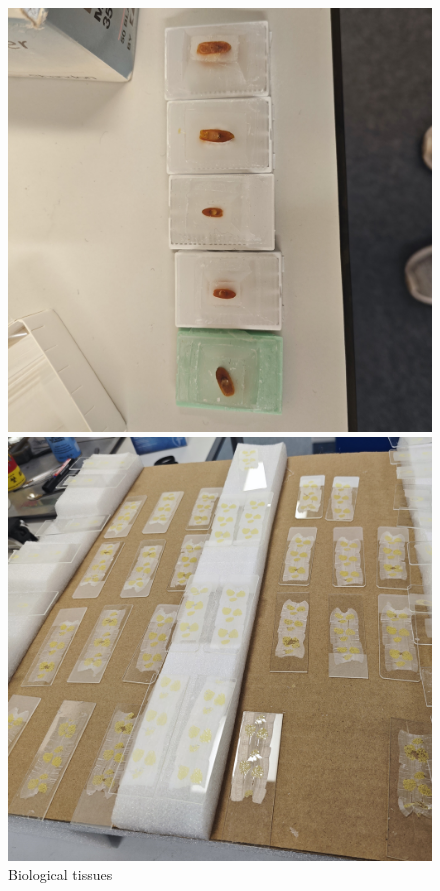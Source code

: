 \begin{figure}[htbp]
    \centering
    \begin{minipage}{0.3\textwidth}
        \centering
        \includegraphics[width=\textwidth]{./fig/sample.jpg}
        \caption{Biological tissues}
        \label{label:sample}
    \end{minipage}
    \begin{minipage}{0.3\textwidth}
        \centering
        \includegraphics[width=\textwidth]{./fig/采集样本.jpg}

\end{minipage}
\end{figure}
